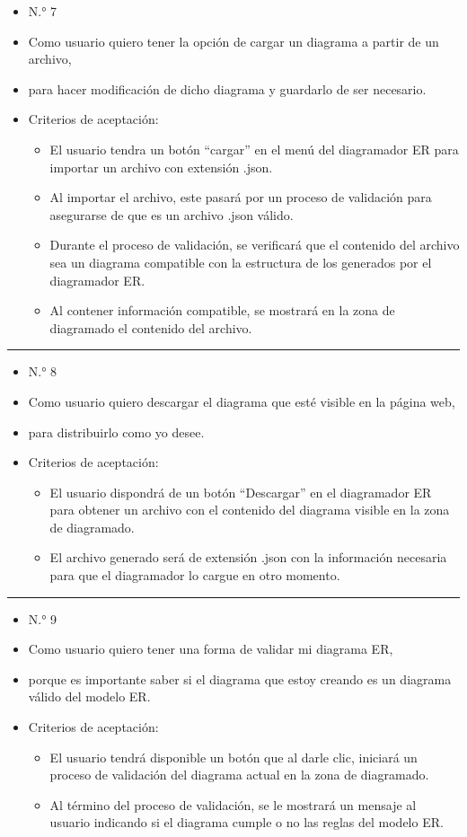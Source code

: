 \begin{itemize}
	\item N.° 7
	\item Como usuario quiero tener la opción de cargar un diagrama a partir de un archivo,
	\item para hacer modificación de dicho diagrama y guardarlo de ser necesario.
	\item Criterios de aceptación:
	\begin{itemize}
		\item El usuario tendra un botón ``cargar'' en el menú del diagramador ER para importar un archivo con extensión .json.
		\item Al importar el archivo, este pasará por un proceso de validación para asegurarse de que es un archivo .json válido.
		\item Durante el proceso de validación, se verificará que el contenido del archivo sea un diagrama compatible con la estructura de los generados por el diagramador ER.
		\item Al contener información compatible, se mostrará en la zona de diagramado el contenido del archivo.
	\end{itemize}
\end{itemize}
\noindent\rule{\textwidth}{1pt}
\begin{itemize}
	\item N.° 8
	\item Como usuario quiero descargar el diagrama que esté visible en la página web,
	\item para distribuirlo como yo desee.
	\item Criterios de aceptación:
	\begin{itemize}
		\item El usuario dispondrá de un botón ``Descargar'' en el diagramador ER para obtener un archivo con el contenido del diagrama visible en la zona de diagramado.
		\item El archivo generado será de extensión .json con la información necesaria para que el diagramador lo cargue en otro momento.
	\end{itemize}
\end{itemize}
\noindent\rule{\textwidth}{1pt}
\begin{itemize}
	\item N.° 9
	\item Como usuario quiero tener una forma de validar mi diagrama ER,
	\item porque es importante saber si el diagrama que estoy creando es un diagrama válido del modelo ER.
	\item Criterios de aceptación:
	\begin{itemize}
		\item El usuario tendrá disponible un botón que al darle clic, iniciará un proceso de validación del diagrama actual en la zona de diagramado.
		\item Al término del proceso de validación, se le mostrará un mensaje al usuario indicando si el diagrama cumple o no las reglas del modelo ER.
	\end{itemize}
\end{itemize}
